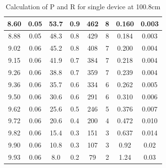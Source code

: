\documentclass[12pt,a4paper]{article}
\begin{document}
\begin{table}[H]
\begin{tabular}{|c|c|c|c|c|c|c|c|}
    8.60     & 0.05  & 53.7      & 0.9 & 462  & 8   & 0.160  & 0.003  \\ \hline
    8.88     & 0.05  & 48.3      & 0.8 & 429  & 8   & 0.184  & 0.003  \\ \hline
    9.02     & 0.06  & 45.2      & 0.8 & 408  & 7   & 0.200  & 0.004  \\ \hline
    9.15     & 0.06  & 41.9      & 0.7 & 384  & 7   & 0.218  & 0.004  \\ \hline
    9.26     & 0.06  & 38.8      & 0.7 & 359  & 7   & 0.239  & 0.004  \\ \hline
    9.36     & 0.06  & 35.7      & 0.6 & 334  & 6   & 0.262  & 0.005  \\ \hline
    9.50     & 0.06  & 30.6      & 0.6 & 291  & 6   & 0.310  & 0.006  \\ \hline
    9.62     & 0.06  & 25.6      & 0.5 & 246  & 5   & 0.376  & 0.007  \\ \hline
    9.72     & 0.06  & 20.6      & 0.4 & 200  & 4   & 0.472  & 0.010  \\ \hline
    9.82     & 0.06  & 15.4      & 0.3 & 151  & 3   & 0.637  & 0.014  \\ \hline
    9.90     & 0.06  & 10.8      & 0.3 & 107  & 3   & 0.92   & 0.02   \\ \hline
    9.93     & 0.06  & 8.0       & 0.2 & 79   & 2   & 1.24   & 0.03   \\ \hline
    \end{tabular}
    \caption{Calculation of P and R for single device at 100.8cm}
\end{table}
\end{document}

